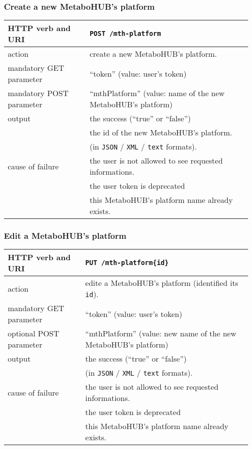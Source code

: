 \subsubsection{Create a new MetaboHUB's platform}
\begin{tabular}{ | l | l | }
	\hline
	HTTP verb and URI & \texttt{POST /mth-platform} \\
	\hline
	action & create a new MetaboHUB's platform. \\
	\hline
	mandatory GET parameter & ``token'' (value: user's token) \\
	\hline
	mandatory POST parameter & ``mthPlatform'' (value: name of the new MetaboHUB's platform) \\
	\hline
	output & the success (``true'' or ``false'')  \\
	\space & the id of the new MetaboHUB's platform.  \\
	\space & (in \texttt{JSON} / \texttt{XML} / \texttt{text} formats). \\
	\hline
	cause of failure & the user is not allowed to see requested informations. \\
	\space & the user token is deprecated \\
	\space & this MetaboHUB's platform name already exists. \\
	\hline
\end{tabular}
\newline

\subsubsection{Edit a MetaboHUB's platform}
\begin{tabular}{ | l | l | }
	\hline
	HTTP verb and URI & \texttt{PUT /mth-platform\{id\}} \\
	\hline
	action & edite a MetaboHUB's platform (identified \via its \texttt{id}). \\
	\hline
	mandatory GET parameter & ``token'' (value: user's token) \\
	\hline
	optional POST parameter & ``mthPlatform'' (value: new name of the new MetaboHUB's platform) \\
	\hline
	output & the success (``true'' or ``false'')  \\
	\space & (in \texttt{JSON} / \texttt{XML} / \texttt{text} formats). \\
	\hline
	cause of failure & the user is not allowed to see requested informations. \\
	\space & the user token is deprecated \\
	\space & this MetaboHUB's platform name already exists. \\
	\hline
\end{tabular}
\newline

